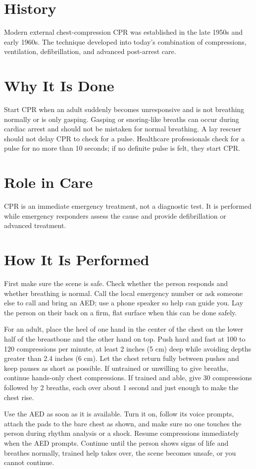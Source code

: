 \section*{History}
Modern external chest-compression CPR was established in the late 1950s and early 1960s. The technique developed into today's combination of compressions, ventilation, defibrillation, and advanced post-arrest care.

\section*{Why It Is Done}
Start CPR when an adult suddenly becomes unresponsive and is not breathing normally or is only gasping. Gasping or snoring-like breaths can occur during cardiac arrest and should not be mistaken for normal breathing. A lay rescuer should not delay CPR to check for a pulse. Healthcare professionals check for a pulse for no more than 10 seconds; if no definite pulse is felt, they start CPR.

\section*{Role in Care}
CPR is an immediate emergency treatment, not a diagnostic test. It is performed while emergency responders assess the cause and provide defibrillation or advanced treatment.

\section*{How It Is Performed}
First make sure the scene is safe. Check whether the person responds and whether breathing is normal. Call the local emergency number or ask someone else to call and bring an AED; use a phone speaker so help can guide you. Lay the person on their back on a firm, flat surface when this can be done safely.

For an adult, place the heel of one hand in the center of the chest on the lower half of the breastbone and the other hand on top. Push hard and fast at 100 to 120 compressions per minute, at least 2 inches (5 cm) deep while avoiding depths greater than 2.4 inches (6 cm). Let the chest return fully between pushes and keep pauses as short as possible. If untrained or unwilling to give breaths, continue hands-only chest compressions. If trained and able, give 30 compressions followed by 2 breaths, each over about 1 second and just enough to make the chest rise.

Use the AED as soon as it is available. Turn it on, follow its voice prompts, attach the pads to the bare chest as shown, and make sure no one touches the person during rhythm analysis or a shock. Resume compressions immediately when the AED prompts. Continue until the person shows signs of life and breathes normally, trained help takes over, the scene becomes unsafe, or you cannot continue.

